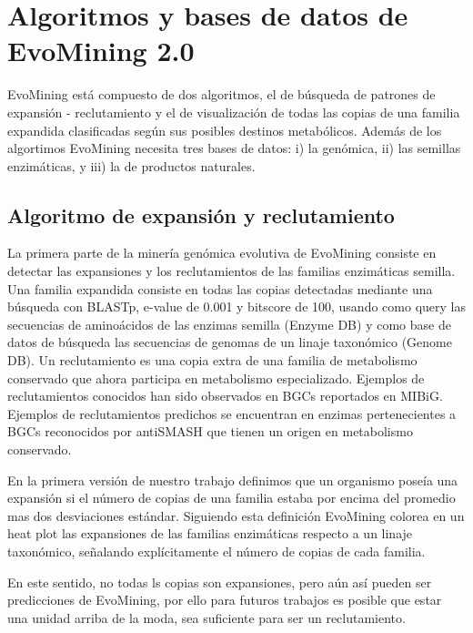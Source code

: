 \documentclass[12pt,twoside]{reedthesis}
\begin{document}
  \section{Algoritmos y bases de datos de EvoMining
  2.0}\label{algoritmos-y-bases-de-datos-de-evomining-2.0-1}
  
  EvoMining está compuesto de dos algoritmos, el de búsqueda de patrones
  de expansión - reclutamiento y el de visualización de todas las copias
  de una familia expandida clasificadas según sus posibles destinos
  metabólicos. Además de los algortimos EvoMining necesita tres bases de
  datos: i) la genómica, ii) las semillas enzimáticas, y iii) la de
  productos naturales.
  
  \subsection{Algoritmo de expansión y
  reclutamiento}\label{algoritmo-de-expansion-y-reclutamiento-1}
  
  La primera parte de la minería genómica evolutiva de EvoMining consiste
  en detectar las expansiones y los reclutamientos de las familias
  enzimáticas semilla. Una familia expandida consiste en todas las copias
  detectadas mediante una búsqueda con BLASTp, e-value de 0.001 y bitscore
  de 100, usando como query las secuencias de aminoácidos de las enzimas
  semilla (Enzyme DB) y como base de datos de búsqueda las secuencias de
  genomas de un linaje taxonómico (Genome DB). Un reclutamiento es una
  copia extra de una familia de metabolismo conservado que ahora participa
  en metabolismo especializado. Ejemplos de reclutamientos conocidos han
  sido observados en BGCs reportados en MIBiG. Ejemplos de reclutamientos
  predichos se encuentran en enzimas pertenecientes a BGCs reconocidos por
  antiSMASH que tienen un origen en metabolismo conservado.
  
  En la primera versión de nuestro trabajo definimos que un organismo
  poseía una expansión si el número de copias de una familia estaba por
  encima del promedio mas dos desviaciones estándar. Siguiendo esta
  definición EvoMining colorea en un heat plot las expansiones de las
  familias enzimáticas respecto a un linaje taxonómico, señalando
  explícitamente el número de copias de cada familia.
  
  En este sentido, no todas ls copias son expansiones, pero aún así pueden
  ser predicciones de EvoMining, por ello para futuros trabajos es posible
  que estar una unidad arriba de la moda, sea suficiente para ser un
  reclutamiento.
  
\end{document}
